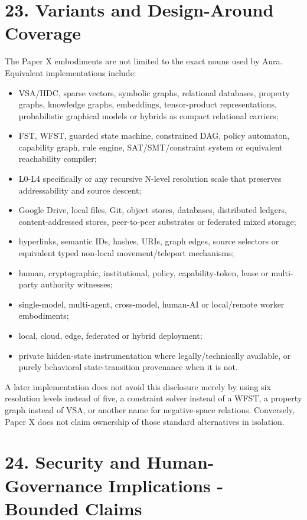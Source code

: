 \documentclass[
  10pt,
  letterpaper,
]{article}
\providecommand{\tightlist}{%
  \setlength{\itemsep}{0pt}\setlength{\parskip}{0pt}}
\begin{document}
\section{23. Variants and Design-Around
Coverage}\label{23-variants-and-design-around-coverage}

The Paper X embodiments are not limited to the exact nouns used by Aura.
Equivalent implementations include:

\begin{itemize}
\tightlist
\item
  VSA/HDC, sparse vectors, symbolic graphs, relational databases,
  property graphs, knowledge graphs, embeddings, tensor-product
  representations, probabilistic graphical models or hybrids as compact
  relational carriers;
\item
  FST, WFST, guarded state machine, constrained DAG, policy automaton,
  capability graph, rule engine, SAT/SMT/constraint system or equivalent
  reachability compiler;
\item
  L0-L4 specifically or any recursive N-level resolution scale that
  preserves addressability and source descent;
\item
  Google Drive, local files, Git, object stores, databases, distributed
  ledgers, content-addressed stores, peer-to-peer substrates or
  federated mixed storage;
\item
  hyperlinks, semantic IDs, hashes, URIs, graph edges, source selectors
  or equivalent typed non-local movement/teleport mechanisms;
\item
  human, cryptographic, institutional, policy, capability-token, lease
  or multi-party authority witnesses;
\item
  single-model, multi-agent, cross-model, human-AI or local/remote
  worker embodiments;
\item
  local, cloud, edge, federated or hybrid deployment;
\item
  private hidden-state instrumentation where legally/technically
  available, or purely behavioral state-transition provenance when it is
  not.
\end{itemize}

A later implementation does not avoid this disclosure merely by using
six resolution levels instead of five, a constraint solver instead of a
WFST, a property graph instead of VSA, or another name for
negative-space relations. Conversely, Paper X does not claim ownership
of those standard alternatives in isolation.

\section{24. Security and Human-Governance Implications - Bounded
Claims}\label{24-security-and-human-governance-implications---bounded-claims}
\end{document}
